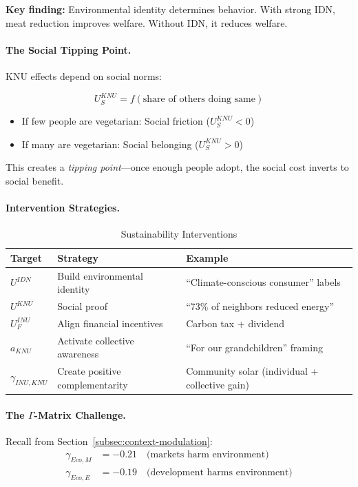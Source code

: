 \textbf{Key finding:} Environmental identity determines behavior.
With strong IDN, meat reduction improves welfare.
Without IDN, it reduces welfare.

\paragraph{The Social Tipping Point.}
KNU effects depend on social norms:

\begin{equation}
U^{KNU}_{S} = f(\text{share of others doing same})
\end{equation}

\begin{itemize}
\item If few people are vegetarian: Social friction ($U^{KNU}_S < 0$)
\item If many are vegetarian: Social belonging ($U^{KNU}_S > 0$)
\end{itemize}

This creates a \emph{tipping point}---once enough people adopt, 
the social cost inverts to social benefit.

\paragraph{Intervention Strategies.}

\begin{table}[htbp]
\centering
\caption{Sustainability Interventions}
\label{tab:sustainability-interventions}
\renewcommand{\arraystretch}{1.3}
\begin{tabular}{@{}lll@{}}
\toprule
\textbf{Target} & \textbf{Strategy} & \textbf{Example} \\
\midrule
$U^{IDN}$ & Build environmental identity & ``Climate-conscious consumer'' labels \\
$U^{KNU}$ & Social proof & ``73\% of neighbors reduced energy'' \\
$U^{INU}_{F}$ & Align financial incentives & Carbon tax + dividend \\
$a_{KNU}$ & Activate collective awareness & ``For our grandchildren'' framing \\
$\gamma_{INU,KNU}$ & Create positive complementarity & Community solar (individual + collective gain) \\
\bottomrule
\end{tabular}
\end{table}

\paragraph{The $\Gamma$-Matrix Challenge.}
Recall from Section~\ref{subsec:context-modulation}:
\begin{align}
\gamma_{Eco,M} &= -0.21 \quad \text{(markets harm environment)} \\
\gamma_{Eco,E} &= -0.19 \quad \text{(development harms environment)}
\end{align}

